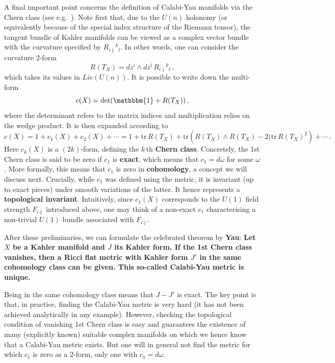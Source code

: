 \documentclass[12pt]{article}
\newcommand{\be}{\begin{equation}}
\newcommand{\ee}{\end{equation}}
\newcommand{\ol}{\overline}
\numberwithin{equation}{section}
\begin{document}
A final important point concerns the definition of Calabi-Yau manifolds via the Chern class (see e.g.~\cite{nak, bert, nashsen, gs}). Note first that, due to the $U(n)$ holonomy (or equivalently because of the special index structure of the Riemann tensor), the tangent bundle of Kahler manifolds can be viewed as a complex vector bundle with the curvature specified by $R_{i\ol{\jmath}}{}^k{}_l$. In other words, one can consider the curvature 2-form 
\be
R(T_X)=dz^i\wedge d\ol{z}^{\ol{\jmath}}\,R_{i\ol{\jmath}}{}^k{}_l\,,
\ee
which takes its values in $Lie(U(n))$. It is possible to write down the multi-form 
\be
c(X)=\mbox{det}(\mathbbm{1}+R(T_X))\,,
\ee
where the determinant refers to the matrix indices and multiplication relies on the wedge product. It is then expanded according to
\be
c(X)=1+c_1(X)+c_2(X)+\cdots=1+\mbox{tr}\,R(T_X)+\mbox{tr}\left( R(T_X)\wedge R(T_X)-2(\mbox{tr}\,R(T_X)^2\right)+\cdots\,.
\ee
Here $c_k(X)$ is a $(2k)$-form, defining the $k\,$th {\bf Chern class}. Concretely, the 1st Chern class is said to be zero if $c_1$ is {\bf exact}, which means that $c_1=d\omega$ for some $\omega$. More formally, this means that $c_1$ is zero in {\bf cohomology}, a concept we will discuss next. Crucially, while $c_1$ was defined using the metric, it is invariant (up to exact pieces) under smooth variations of the latter. It hence represents a {\bf topological invariant}. Intuitively, since $c_1(X)$ corresponds to the $U(1)$ field strength $F_{i\ol{\jmath}}$ introduced above, one may think of a non-exact $c_1$ characterising a non-trivial $U(1)$ bundle associated with $F_{i\ol{\jmath}}$.

After these preliminaries, we can formulate the celebrated theorem by {\bf Yau}:\hspace*{.2cm} {\bf Let $X$ be a Kahler manifold and $J$ its Kahler form. If the 1st Chern class vanishes, then a Ricci flat metric with Kahler form $J'$ in the same cohomology class can be given. This so-called Calabi-Yau metric is unique.}

Being in the same cohomology class means that $J-J'$ is exact. The key point is that, in practice, finding the Calabi-Yau metric is very hard (it has not been achieved analytically in any example). However, checking the topological condition of vanishing 1st Chern class is easy and guarantees the existence of many (explicitly known) suitable complex manifolds on which we hence know that a Calabi-Yau metric exists. But one will in general not find the metric for which $c_1$ is zero as a 2-form, only one with $c_1=d\omega$. 
\end{document}
